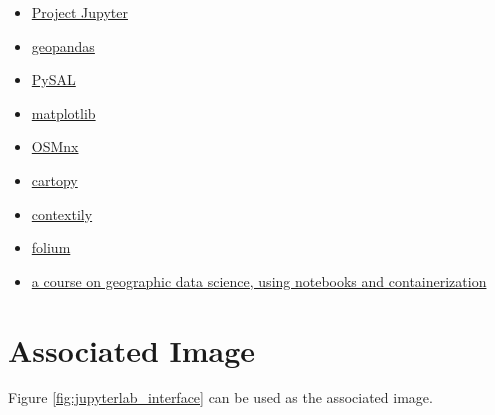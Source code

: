 \documentclass[11pt,letterpaper]{article}
\begin{document}
\begin{itemize}
    \item \href{https://jupyter.org/}{Project Jupyter}
    \item \href{https://geopandas.org/}{geopandas}
    \item \href{https://pysal.org/}{PySAL}
    \item \href{https://matplotlib.org/}{matplotlib}
    \item \href{https://osmnx.readthedocs.io/}{OSMnx}
    \item \href{https://scitools.org.uk/cartopy/docs/latest/}{cartopy}
    \item \href{https://contextily.readthedocs.io/}{contextily}
    \item \href{https://python-visualization.github.io/folium/}{folium}
    \item \href{https://doi.org/10.5281/zenodo.1135210}{a course on geographic data science, using notebooks and containerization}
\end{itemize}

\section*{Associated Image}

Figure \ref{fig:jupyterlab_interface} can be used as the associated image.
\end{document}

